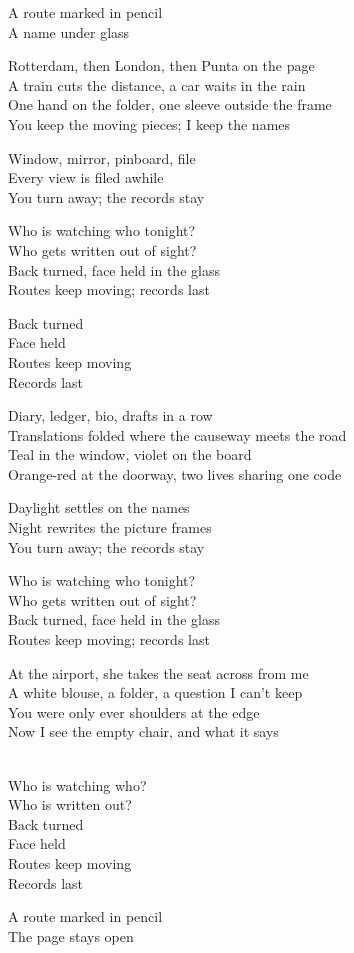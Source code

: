 \begin{lyrics}
A route marked in pencil\\
A name under glass

Rotterdam, then London, then Punta on the page\\
A train cuts the distance, a car waits in the rain\\
One hand on the folder, one sleeve outside the frame\\
You keep the moving pieces; I keep the names

Window, mirror, pinboard, file\\
Every view is filed awhile\\
You turn away; the records stay

Who is watching who tonight?\\
Who gets written out of sight?\\
Back turned, face held in the glass\\
Routes keep moving; records last

Back turned\\
Face held\\
Routes keep moving\\
Records last

Diary, ledger, bio, drafts in a row\\
Translations folded where the causeway meets the road\\
Teal in the window, violet on the board\\
Orange-red at the doorway, two lives sharing one code

Daylight settles on the names\\
Night rewrites the picture frames\\
You turn away; the records stay

Who is watching who tonight?\\
Who gets written out of sight?\\
Back turned, face held in the glass\\
Routes keep moving; records last

At the airport, she takes the seat across from me\\
A white blouse, a folder, a question I can’t keep\\
You were only ever shoulders at the edge\\
Now I see the empty chair, and what it says

\\
Who is watching who?\\
Who is written out?\\
Back turned\\
Face held\\
Routes keep moving\\
Records last

A route marked in pencil\\
The page stays open
\end{lyrics}

